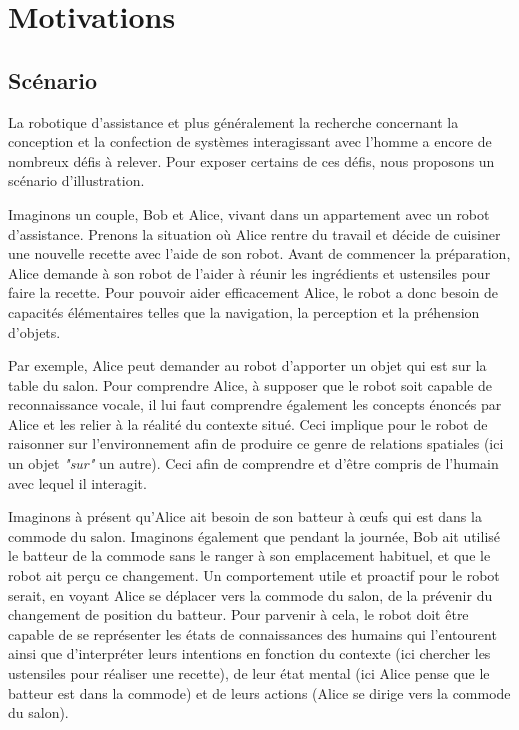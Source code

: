 \documentclass[a4paper,11pt,twoside]{StyleThese}
\begin{document}
\section{Motivations}


\subsection{Scénario}

La robotique d'assistance et plus généralement la recherche concernant la conception et la confection de systèmes interagissant avec l'homme a encore de nombreux défis à relever. Pour exposer certains de ces défis, nous proposons un scénario d'illustration.

Imaginons un couple, Bob et Alice, vivant dans un appartement avec un robot d'assistance. Prenons la situation où Alice rentre du travail et décide de cuisiner une nouvelle recette avec l'aide de son robot. Avant de commencer la préparation, Alice demande à son robot de l'aider à réunir les ingrédients et ustensiles pour faire la recette.
Pour pouvoir aider efficacement Alice, le robot a donc besoin de capacités élémentaires telles que la navigation, la perception et la préhension d'objets.

Par exemple, Alice peut demander au robot d'apporter un objet qui est sur la table du salon. Pour comprendre Alice, à supposer que le robot soit capable de reconnaissance vocale, il lui faut comprendre également les concepts énoncés par Alice et les relier à la réalité du contexte situé. Ceci implique pour le robot de raisonner sur l'environnement afin de produire ce genre de relations spatiales (ici un objet \textit{"sur"} un autre). Ceci afin de comprendre et d'être compris de l'humain avec lequel il interagit.

Imaginons à présent qu'Alice ait besoin de son batteur à œufs qui est dans la commode du salon. Imaginons également que pendant la journée, Bob ait utilisé le batteur de la commode sans le ranger à son emplacement habituel, et que le robot ait perçu ce changement.
Un comportement utile et proactif pour le robot serait, en voyant Alice se déplacer vers la commode du salon, de la prévenir du changement de position du batteur.
Pour parvenir à cela, le robot doit être capable de se représenter les états de connaissances des humains qui l'entourent ainsi que d'interpréter leurs intentions en fonction du contexte (ici chercher les ustensiles pour réaliser une recette), de leur état mental (ici Alice pense que le batteur est dans la commode) et de leurs actions (Alice se dirige vers la commode du salon).
\end{document}
